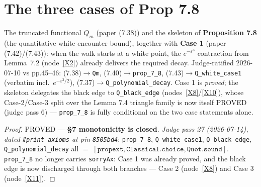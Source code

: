 \section{The three cases of Prop 7.8}

\begin{proposition}\label{X7}
  \leanok
The truncated functional \(Q_m\) (paper (7.38)) and the skeleton of \textbf{Proposition 7.8}
(the quantitative white-encounter bound), together with \textbf{Case 1} (paper (7.42)/(7.43)):
when the walk starts at a white point, the \(e^{-\varepsilon^3}\) contraction from Lemma~7.2
(node~\ref{X2}) already delivers the required decay.  Judge-ratified 2026-07-10 vs pp.45--46:
(7.38)\(\to\)\texttt{Qm}, (7.40)\(\to\)\texttt{prop\_7\_8}, (7.43)\(\to\)\texttt{Q\_white\_case1}
(verbatim incl.\ \(e^{-\varepsilon^3/2}\)), (7.37)\(\to\)\texttt{Q\_polynomial\_decay}.  Case 1
is \emph{proved}; the skeleton delegates the black edge to \texttt{Q\_black\_edge}
(nodes~\ref{X8}/\ref{X10}), whose Case-2/Case-3 split over the Lemma 7.4 triangle family
is now itself PROVED (judge pass 6) --- \texttt{prop\_7\_8} is fully conditional on the
two case statements alone.
\end{proposition}

\begin{proof}
  \leanok
  PROVED --- \textbf{\S7 monotonicity is closed}.  \emph{Judge pass 27 (2026-07-14), dated
  \texttt{\#print axioms} at pin \texttt{8505bd4}}: \texttt{prop\_7\_8},
  \texttt{Q\_white\_case1}, \texttt{Q\_black\_edge}, \texttt{Q\_polynomial\_decay} all \(=\)
  \([\texttt{propext}, \texttt{Classical.choice}, \texttt{Quot.sound}]\).  \texttt{prop\_7\_8}
  no longer carries \texttt{sorryAx}: Case 1 was already proved, and the black edge is now
  discharged through both branches --- Case 2 (node~\ref{X8}) and Case 3 (node~\ref{X11}).
\end{proof}

